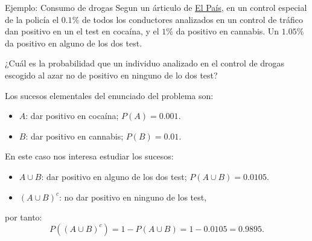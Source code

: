 \documentclass[
  ignorenonframetext,
]{beamer}
\providecommand{\tightlist}{%
  \setlength{\itemsep}{0pt}\setlength{\parskip}{0pt}}
\begin{document}
\begin{frame}{Ejemplo: Consumo de drogas}
\protect\hypertarget{ejemplo-consumo-de-drogas}{}
Segun un árticulo de
\href{https://elpais.com/politica/2019/01/02/actualidad/1546426491_623324.html}{El
País}, en un control especial de la policía el \(0.1\%\) de todos los
conductores analizados en un control de tráfico dan positivo en un el
test en cocaína, y el \(1\%\) da positivo en cannabis. Un \(1.05\%\) da
positivo en alguno de los dos test.

¿Cuál es la probabilidad que un individuo analizado en el control de
drogas escogido al azar no de positivo en ninguno de lo dos test?

Los sucesos elementales del enunciado del problema son:

\begin{itemize}
\tightlist
\item
  \(A\): dar positivo en cocaína; \(P(A)=0.001.\)
\item
  \(B\): dar positivo en cannabis; \(P(B)=0.01.\)
\end{itemize}

En este caso nos interesa estudiar los sucesos:

\begin{itemize}
\tightlist
\item
  \(A\cup B\): dar positivo en alguno de los dos test;
  \(P(A\cup B)=0.0105.\)
\item
  \((A\cup B)^c\): no dar positivo en ninguno de los test,
\end{itemize}

por tanto: \[P((A\cup B)^c)=1-P(A\cup B)=1-0.0105=0.9895.\]
\end{frame}
\end{document}
